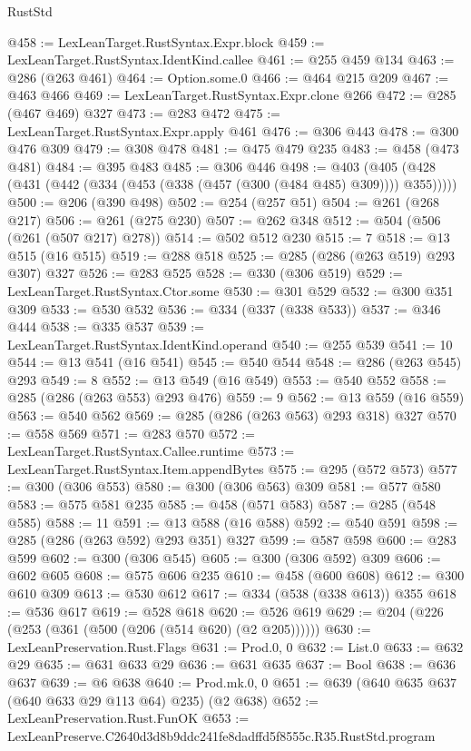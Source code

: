 \begin{lexlean}{RustStd}
\begin{coremodule}
@458 := LexLeanTarget.RustSyntax.Expr.block
@459 := LexLeanTarget.RustSyntax.IdentKind.callee
@461 := @255 @459 @134
@463 := @286 (@263 @461)
@464 := Option.some.{0}
@466 := @464 @215 @209
@467 := @463 @466
@469 := LexLeanTarget.RustSyntax.Expr.clone @266
@472 := @285 (@467 @469) @327
@473 := @283 @472
@475 := LexLeanTarget.RustSyntax.Expr.apply @461
@476 := @306 @443
@478 := @300 @476 @309
@479 := @308 @478
@481 := @475 @479 @235
@483 := @458 (@473 @481)
@484 := @395 @483
@485 := @306 @446
@498 := @403 (@405 (@428 (@431 (@442 (@334 (@453 (@338 (@457 (@300 (@484 @485) @309)))) @355)))))
@500 := @206 (@390 @498)
@502 := @254 (@257 @51)
@504 := @261 (@268 @217)
@506 := @261 (@275 @230)
@507 := @262 @348
@512 := @504 (@506 (@261 (@507 @217) @278))
@514 := @502 @512 @230
@515 := 7
@518 := @13 @515 (@16 @515)
@519 := @288 @518
@525 := @285 (@286 (@263 @519) @293 @307) @327
@526 := @283 @525
@528 := @330 (@306 @519)
@529 := LexLeanTarget.RustSyntax.Ctor.some
@530 := @301 @529
@532 := @300 @351 @309
@533 := @530 @532
@536 := @334 (@337 (@338 @533))
@537 := @346 @444
@538 := @335 @537
@539 := LexLeanTarget.RustSyntax.IdentKind.operand
@540 := @255 @539
@541 := 10
@544 := @13 @541 (@16 @541)
@545 := @540 @544
@548 := @286 (@263 @545) @293
@549 := 8
@552 := @13 @549 (@16 @549)
@553 := @540 @552
@558 := @285 (@286 (@263 @553) @293 @476)
@559 := 9
@562 := @13 @559 (@16 @559)
@563 := @540 @562
@569 := @285 (@286 (@263 @563) @293 @318) @327
@570 := @558 @569
@571 := @283 @570
@572 := LexLeanTarget.RustSyntax.Callee.runtime
@573 := LexLeanTarget.RustSyntax.Item.appendBytes
@575 := @295 (@572 @573)
@577 := @300 (@306 @553)
@580 := @300 (@306 @563) @309
@581 := @577 @580
@583 := @575 @581 @235
@585 := @458 (@571 @583)
@587 := @285 (@548 @585)
@588 := 11
@591 := @13 @588 (@16 @588)
@592 := @540 @591
@598 := @285 (@286 (@263 @592) @293 @351) @327
@599 := @587 @598
@600 := @283 @599
@602 := @300 (@306 @545)
@605 := @300 (@306 @592) @309
@606 := @602 @605
@608 := @575 @606 @235
@610 := @458 (@600 @608)
@612 := @300 @610 @309
@613 := @530 @612
@617 := @334 (@538 (@338 @613)) @355
@618 := @536 @617
@619 := @528 @618
@620 := @526 @619
@629 := @204 (@226 (@253 (@361 (@500 (@206 (@514 @620) (@2 @205))))))
@630 := LexLeanPreservation.Rust.Flags
@631 := Prod.{0, 0}
@632 := List.{0}
@633 := @632 @29
@635 := @631 @633 @29
@636 := @631 @635
@637 := Bool
@638 := @636 @637
@639 := @6 @638
@640 := Prod.mk.{0, 0}
@651 := @639 (@640 @635 @637 (@640 @633 @29 @113 @64) @235) (@2 @638)
@652 := LexLeanPreservation.Rust.FunOK
@653 := LexLeanPreserve.C2640d3d8b9ddc241fe8dadffd5f8555c.R35.RustStd.program

\end{coremodule}
\end{lexlean}
